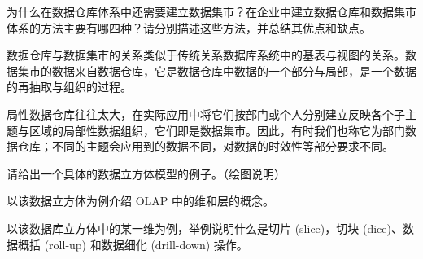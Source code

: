 \begin{problem}
为什么在数据仓库体系中还需要建立数据集市？在企业中建立数据仓库和数据集市体系的方法主要有哪四种？请分别描述这些方法，并总结其优点和缺点。
\end{problem}

\begin{solution}
数据仓库与数据集市的关系类似于传统关系数据库系统中的基表与视图的关系。数据集市的数据来自数据仓库，它是数据仓库中数据的一个部分与局部，是一个数据的再抽取与组织的过程。

局性数据仓库往往太大，在实际应用中将它们按部门或个人分别建立反映各个子主题与区域的局部性数据组织，它们即是数据集市。因此，有时我们也称它为部门数据仓库；不同的主题会应用到的数据不同，对数据的时效性等部分要求不同。





\end{solution}


\begin{problem}
 请给出一个具体的数据立方体模型的例子。（绘图说明）

 以该数据立方体为例介绍 OLAP 中的维和层的概念。

 以该数据库立方体中的某一维为例，举例说明什么是切片 (slice)，切块 (dice)、数据概括 (roll-up) 和数据细化 (drill-down) 操作。
\end{problem}

